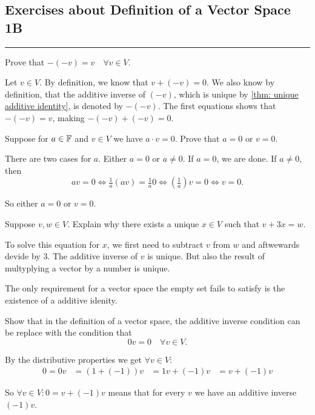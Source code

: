 \subsection*{Exercises about Definition of a Vector Space 1B}
\hrule
\phantom{.}

\begin{xrcs}
  Prove that $-(-v) = v \quad \forall v \in V$.

  \begin{xprf}
    Let $v \in V$. By definition, we know that $v + (-v) = 0$. We also know by definition, that the additive inverse of $(-v)$, which is unique by \ref{thm: unique additive identity}, is denoted by $-(-v)$. The first equations shows that $-(-v) = v$, making $-(-v) + (-v) = 0$.
  \end{xprf}
\end{xrcs}

\begin{xrcs}
  Suppose for $a \in \mathbb{F}$ and $v \in V$ we have $a \cdot v = 0$. Prove that $a=0$ or $v=0$.

  \begin{xprf}
    There are two cases for $a$. Either $a=0$ or $a\neq 0$. If $a=0$, we are done. If $a \neq 0$, then
    \[
    av=0 \iff \tfrac{1}{a}(av)=\tfrac{1}{a}0 \iff \left(\tfrac{1}{a} \right)v = 0 \iff v = 0.
    \]

    So either $a=0$ or $v=0$.
  \end{xprf}
\end{xrcs}


\begin{xrcs}
  Suppose $v,w \in V$. Explain why there exists a unique $x \in V$ such that $v + 3x = w$.

  \begin{xsol}
    To solve this equation for $x$, we first need to subtract $v$ from $w$ and aftwewards devide by $3$. The additive inverse of $v$ is unique. But also the result of multyplying a vector by a number is unique.
  \end{xsol}
\end{xrcs}

\begin{xrcs}
   The only requirement for a vector space the empty set fails to satisfy is the existence of a additive idenity.
\end{xrcs}

\begin{xrcs}
  Show that in the definition of a vector space, the additive inverse condition can be replace with the condition that
  \[
    0v = 0 \quad \forall v \in V.
  \]

  \begin{xprf}
    By the distributive properties we get $\forall v \in V:$
    \[
    \begin{aligned}
      0 = 0v &= (1 + (-1))v
      &= 1v + (-1)v
      &= v + (-1)v
    \end{aligned}
    \]

    So $\forall v \in V: 0= v + (-1)v$ means that for every $v$ we have an additive inverse $(-1)v$.
  \end{xprf}
\end{xrcs}
